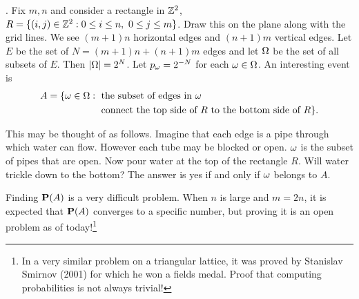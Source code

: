 \documentclass[preprint,  11pt]{amsart}
\begin{document}
\begin{example}. Fix $m,n$ and consider a rectangle in $\Z^{2}$, $R=\{(i,j)\in \Z^{2}\suchthat 0\le i\le n, \ 0\le j\le m\}$. Draw this on the plane along with the grid lines. We see $(m+1)n$ horizontal edges and $(n+1)m$ vertical edges. Let $E$ be the set of $N=(m+1)n+(n+1)m$ edges and let $\Ome$ be the set of all subsets of $E$. Then $|\Ome|=2^{N}$. Let $p_{\ome}=2^{-N}$ for each $\ome \in \Ome$. An interesting event is 
\begin{align*}
A=\{\ome \in \Ome\suchthat & \mb{ the subset of edges in }\ome \\
 & \mb{ connect  the top side of }R \mb{ to the bottom side of }R\}.
\end{align*}

This may be thought of as follows. Imagine that each edge is a pipe through which water can flow. However each tube may be blocked or open. $\ome$ is the subset of pipes that are open. Now pour water at the top of the rectangle $R$. Will water trickle down to the bottom? The answer is yes if and only if $\ome$ belongs to $A$.

Finding $\P(A)$ is a very difficult problem. When $n$ is large and $m=2 n$, it is expected that $\P(A)$ converges to a specific number, but proving it is an open problem as of today!\footnote{In a very similar problem on a triangular lattice, it was proved by Stanislav Smirnov (2001) for which he won a fields medal. Proof that computing probabilities is not always trivial!}
\end{example}
\end{document}
